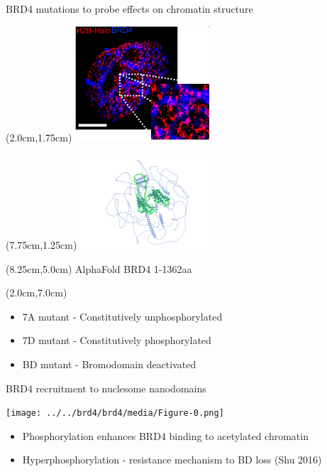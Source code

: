 \documentclass{beamer}					%
\begin{document}
\begin{frame}{BRD4 mutations to probe effects on chromatin structure}

\begin{textblock*}{5cm}(2.0cm,1.75cm)
\includegraphics[width=5cm]{../../dissertation/dissertation/media/TwoColor}
\end{textblock*}

\begin{textblock*}{5cm}(7.75cm,1.25cm)
\includegraphics[width=5cm]{../../brd4/brd4/media/AlphaFoldStructure}
\end{textblock*}

\begin{textblock*}{5cm}(8.25cm,5.0cm)
AlphaFold BRD4 1-1362aa 
\end{textblock*}


\begin{textblock*}{10cm}(2.0cm,7.0cm)
\begin{itemize}
\item 7A mutant - Constitutively unphosphorylated
\item 7D mutant - Constitutively phosphorylated
\item BD mutant - Bromodomain deactivated
\end{itemize}
\end{textblock*}

\end{frame}


\begin{frame}{BRD4 recruitment to nuclesome nanodomains}
\begin{center}
\texttt{[image: ../../brd4/brd4/media/Figure-0.png]}
\end{center}
\begin{itemize}
\item Phosphorylation enhances BRD4 binding to acetylated chromatin
\item Hyperphosphorylation - resistance mechanism to BD loss (Shu 2016)
\end{itemize}
\end{frame}
\end{document}
